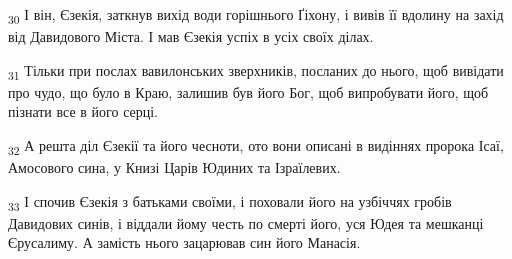 \begin{tcolorbox}
\textsubscript{30} І він, Єзекія, заткнув вихід води горішнього Ґіхону, і вивів її вдолину на захід від Давидового Міста. І мав Єзекія успіх в усіх своїх ділах.
\end{tcolorbox}
\begin{tcolorbox}
\textsubscript{31} Тільки при послах вавилонських зверхників, посланих до нього, щоб вивідати про чудо, що було в Краю, залишив був його Бог, щоб випробувати його, щоб пізнати все в його серці.
\end{tcolorbox}
\begin{tcolorbox}
\textsubscript{32} А решта діл Єзекії та його чесноти, ото вони описані в видіннях пророка Ісаї, Амосового сина, у Книзі Царів Юдиних та Ізраїлевих.
\end{tcolorbox}
\begin{tcolorbox}
\textsubscript{33} І спочив Єзекія з батьками своїми, і поховали його на узбіччях гробів Давидових синів, і віддали йому честь по смерті його, уся Юдея та мешканці Єрусалиму. А замість нього зацарював син його Манасія.
\end{tcolorbox}
